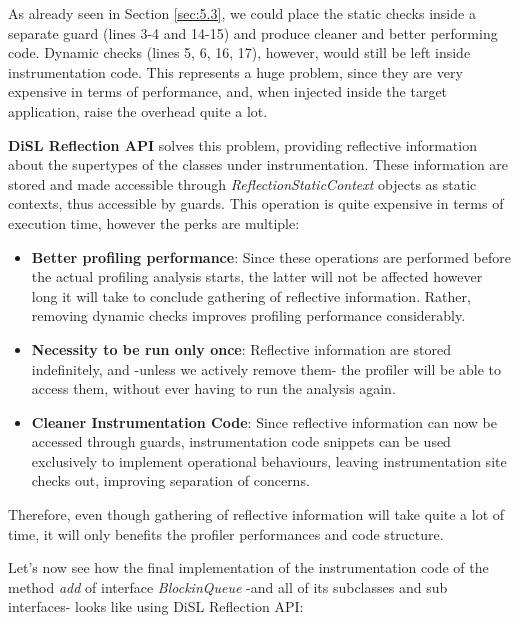 \documentclass[]{usiinfthesis}
\begin{document}
\noindent
As already seen in Section \ref{sec:5.3}, we could place the static checks inside a separate guard (lines 3-4 and 14-15) and produce cleaner and better performing code. Dynamic checks (lines 5, 6, 16, 17), however, would still be left inside instrumentation code. This represents a huge problem, since they are very expensive in terms of performance, and, when injected inside the target application, raise the overhead quite a lot.

\noindent
\textbf{DiSL Reflection API} \cite{DiSLReflectionAPI} solves this problem, providing reflective information about the supertypes of the classes under instrumentation. These information are stored and made accessible through \textit{ReflectionStaticContext} objects as static contexts, thus accessible by guards. This operation is quite expensive in terms of execution time, however the perks are multiple:
\begin{itemize}
    \item \textbf{Better profiling performance}: Since these operations are performed before the actual profiling analysis starts, the latter will not be affected however long it will take to conclude gathering of reflective information. Rather, removing dynamic checks improves profiling performance considerably. 
    \item \textbf{Necessity to be run only once}: Reflective information are stored indefinitely, and -unless we actively remove them- the profiler will be able to access them, without ever having to run the analysis again.
    \item \textbf{Cleaner Instrumentation Code}: Since reflective information can now be accessed through guards, instrumentation code snippets can be used exclusively to implement operational behaviours, leaving instrumentation site checks out, improving separation of concerns. 
\end{itemize}
Therefore, even though gathering of reflective information will take quite a lot of time, it will only benefits the profiler performances and code structure. 

\vspace*{0.5cm}
\noindent
Let's now see how the final implementation of the instrumentation code of the method \textit{add} of interface \textit{BlockinQueue} -and all of its subclasses and sub interfaces- looks like using DiSL Reflection API:
\end{document}
